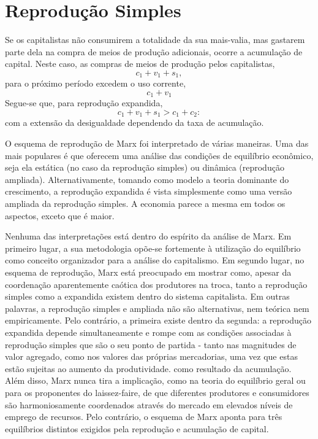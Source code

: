 \section{Reprodução Simples}
 \par 
Se os capitalistas não consumirem a totalidade da sua mais-valia, mas gastarem parte dela na compra de meios de produção adicionais, ocorre a acumulação de capital. Neste caso, as compras de meios de produção pelos capitalistas,  $$ c_{1} + v_{1} + s_{1},$$   para o próximo período excedem o uso corrente,  $$ c_{1} + v_{1} $$   Segue-se que, para reprodução expandida,  $$ c_{1} + v_{1} + s_{1} > c_{1} + c_{2}:$$   com a extensão da desigualdade dependendo da taxa de acumulação.
 \par 
O esquema de reprodução de Marx foi interpretado de várias maneiras. Uma das mais populares é que oferecem uma análise das condições de equilíbrio econômico, seja ela estática (no caso da reprodução simples) ou dinâmica (reprodução ampliada). Alternativamente, tomando como modelo a teoria dominante do crescimento, a reprodução expandida é vista simplesmente como uma versão ampliada da reprodução simples. A economia parece a mesma em todos os aspectos, exceto que é maior.
 \par 
Nenhuma das interpretações está dentro do espírito da análise de Marx. Em primeiro lugar, a sua metodologia opõe-se fortemente à utilização do equilíbrio como conceito organizador para a análise do capitalismo. Em segundo lugar, no esquema de reprodução, Marx está preocupado em mostrar como, apesar da coordenação aparentemente caótica dos produtores na troca, tanto a reprodução simples como a expandida existem dentro do sistema capitalista. Em outras palavras, a reprodução simples e ampliada não são alternativas, nem teórica nem empiricamente. Pelo contrário, a primeira existe dentro da segunda: a reprodução expandida depende simultaneamente e rompe com as condições associadas à reprodução simples que são o seu ponto de partida - tanto nas magnitudes de valor agregado, como nos valores das próprias mercadorias, uma vez que estas estão sujeitas ao aumento da produtividade. como resultado da acumulação. Além disso, Marx nunca tira a implicação, como na teoria do equilíbrio geral ou para os proponentes do laissez-faire, de que diferentes produtores e consumidores são harmoniosamente coordenados através do mercado em elevados níveis de emprego de recursos. Pelo contrário, o esquema de Marx aponta para três equilíbrios distintos exigidos pela reprodução e acumulação de capital.
 \par 
